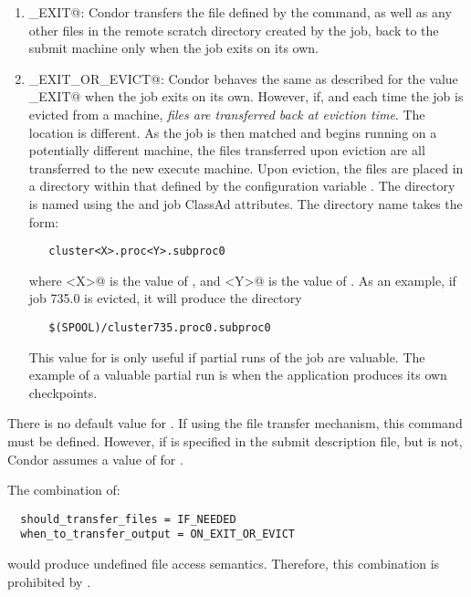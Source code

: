\begin{enumerate}
\item \verb@ON_EXIT@: Condor transfers the file defined by the
 command,
 as well as any other files in the remote scratch directory created by the job,
back to the submit machine only when the job exits on its own.

\item \verb@ON_EXIT_OR_EVICT@:
Condor behaves the same as described for the value \verb@ON_EXIT@
when the job exits on its own. 
However, if, and each time the job is evicted from a machine,
\emph{files are transferred back at eviction time}.
The location is different.
As the job is then matched and begins running on a potentially different
machine, the files transferred upon eviction are all transferred
to the new execute machine.
Upon eviction,
the files are placed in a directory within that defined by the configuration
variable .
The directory is named using the
 and  job ClassAd attributes. 
The directory name takes the form:
\begin{verbatim}
   cluster<X>.proc<Y>.subproc0
\end{verbatim}
where \verb@<X>@ is the value of , and 
\verb@<Y>@ is the value of . 
As an example, if job 735.0 is evicted, it will produce the directory
\begin{verbatim}
   $(SPOOL)/cluster735.proc0.subproc0
\end{verbatim}

This value for 
is only useful if partial runs of the job are valuable.
The example of a valuable partial run is when the application
produces its own checkpoints.
\end{enumerate}

There is no default value for .
If using the file transfer mechanism, 
this command must be defined.
However, if  is specified in the submit
description file,
but  is not, Condor assumes a
value of \verb@YES@ for .

\Note The combination of:
\begin{verbatim}
  should_transfer_files = IF_NEEDED
  when_to_transfer_output = ON_EXIT_OR_EVICT
\end{verbatim}
would produce undefined file access semantics.
Therefore, this combination is prohibited by .

